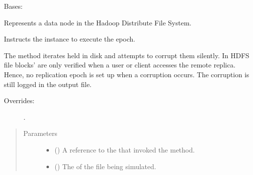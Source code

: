 \documentclass[letterpaper,10pt,english]{sphinxmanual}
\begin{document}
\begin{fulllineitems}
\label{\detokenize{app.domain:app.domain.network_nodes.HDFSNode}}
Bases: {\hyperref[\detokenize{app.domain:app.domain.network_nodes.Node}]{}}

Represents a data node in the Hadoop Distribute File System.

\begin{fulllineitems}
\label{\detokenize{app.domain:app.domain.network_nodes.HDFSNode.execute_epoch}}
Instructs the  instance to execute the epoch.

The method iterates  held in disk and attempts to
corrupt them silently. In HDFS file blocks’  are only
verified when a user or client accesses the remote replica. Hence,
no replication epoch is set up when a corruption occurs. The
corruption is still logged in the output file.
\begin{description}
\item[{Overrides:}] \leavevmode
{\hyperref[\detokenize{app.domain:app.domain.network_nodes.Node.execute_epoch}]{}}.

\end{description}
\begin{quote}\begin{description}
\item[{Parameters}] \leavevmode\begin{itemize}
\item {} 
 ({\hyperref[\detokenize{app:app.type_hints.ClusterType}]{}}) \textendash{} A reference to the
{\hyperref[\detokenize{app.domain:app.domain.cluster_groups.Cluster}]{}} that invoked
the  method.

\item {} 
 () \textendash{} The {\hyperref[\detokenize{app.domain.helpers:app.domain.helpers.smart_dataclasses.FileData.name}]{}}
of the file being simulated.


\end{itemize}
\end{description}
\end{quote}
\end{fulllineitems}
\end{fulllineitems}
\end{document}
